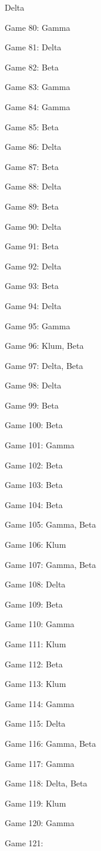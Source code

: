 \documentclass{article}
\begin{document}
\begin{multicols}{3}
\begin{compactitem}
Delta
\item Game 80:
Gamma
\item Game 81:
Delta
\item Game 82:
Beta
\item Game 83:
Gamma
\item Game 84:
Gamma
\item Game 85:
Beta
\item Game 86:
Delta
\item Game 87:
Beta
\item Game 88:
Delta
\item Game 89:
Beta
\item Game 90:
Delta
\item Game 91:
Beta
\item Game 92:
Delta
\item Game 93:
Beta
\item Game 94:
Delta
\item Game 95:
Gamma
\item Game 96:
Klum, Beta
\item Game 97:
Delta, Beta
\item Game 98:
Delta
\item Game 99:
Beta
\item Game 100:
Beta
\item Game 101:
Gamma
\item Game 102:
Beta
\item Game 103:
Beta
\item Game 104:
Beta
\item Game 105:
Gamma, Beta
\item Game 106:
Klum
\item Game 107:
Gamma, Beta
\item Game 108:
Delta
\item Game 109:
Beta
\item Game 110:
Gamma
\item Game 111:
Klum
\item Game 112:
Beta
\item Game 113:
Klum
\item Game 114:
Gamma
\item Game 115:
Delta
\item Game 116:
Gamma, Beta
\item Game 117:
Gamma
\item Game 118:
Delta, Beta
\item Game 119:
Klum
\item Game 120:
Gamma
\item Game 121:

\end{compactitem}
\end{multicols}
\end{document}
